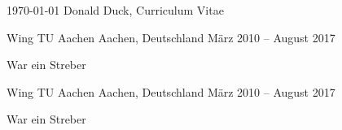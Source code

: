 \documentclass[11pt, a4paper]{awesome-cv}
\begin{document}
\makecvheader[L]

\makecvfooter
  {\today}
  {Donald Duck, Curriculum Vitae}
  {\thepage}





\begin{cventries}

  \cventry
    {Wing} %
    {TU Aachen} %
    {Aachen, Deutschland} %
    {März 2010 -- August 2017} %
    {
      \begin{cvitems} %
        \item {War ein Streber}
      \end{cvitems}
    }

  \cventry
    {Wing} %
    {TU Aachen} %
    {Aachen, Deutschland} %
    {März 2010 -- August 2017} %
    {
      \begin{cvitems} %
        \item {War ein Streber}
      \end{cvitems}
    }


\end{cventries}



\end{document}
